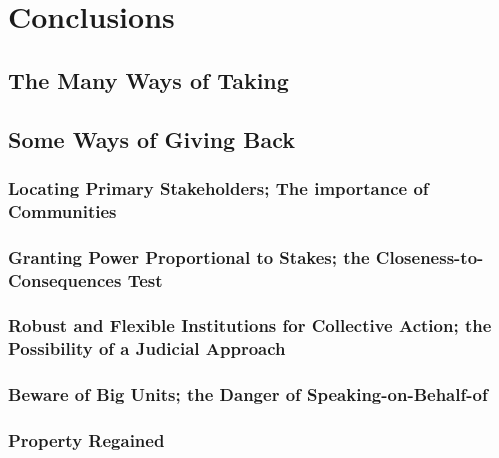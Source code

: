 \chapter{Conclusions}

\section{The Many Ways of Taking}

\section{Some Ways of Giving Back}

\subsection{Locating Primary Stakeholders; The importance of Communities}

\subsection{Granting Power Proportional to Stakes; the Closeness-to-Consequences Test}

\subsection{Robust and Flexible Institutions for Collective Action; the Possibility of a Judicial Approach}

\subsection{Beware of Big Units; the Danger of Speaking-on-Behalf-of}

\subsection{Property Regained}
